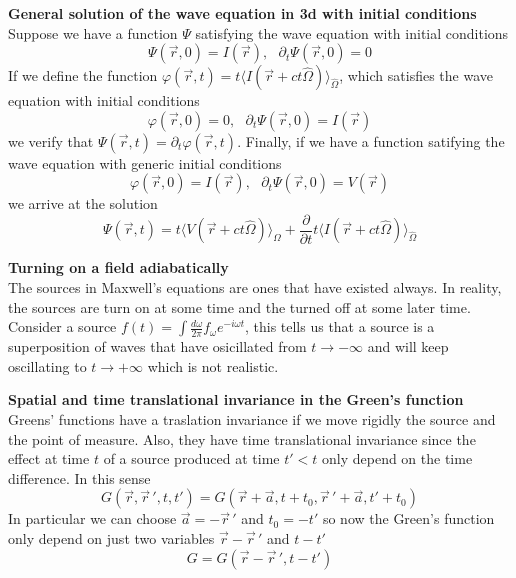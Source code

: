 \documentclass[12pt,a4paper]{article}
\newcommand{\pd}[2]{\frac{\partial #1}{\partial #2}} %
\begin{document}
\textbf{General solution of the wave equation in 3d with initial conditions}\\
Suppose we have a function $\Psi$ satisfying the wave equation with initial conditions
\begin{equation}
	\Psi(\vec{r},0) = I(\vec{r}), \ \ \ \partial_t \Psi(\vec{r},0) = 0
\end{equation}
If we define the function $\varphi(\vec{r},t) =t \langle I(\vec{r} + ct\hat{\Omega}) \rangle_{\hat{\Omega}}$, which satisfies the wave equation with initial conditions 
\begin{equation}
	\varphi(\vec{r},0) = 0, \ \ \ \partial_t \Psi(\vec{r},0) = I(\vec{r})
\end{equation}
we verify that $\Psi(\vec{r},t) = \partial_t \varphi(\vec{r},t)$. Finally, if we have a function satifying the wave equation with generic initial conditions
\begin{equation}
	\varphi(\vec{r},0) = I(\vec{r}), \ \ \ \partial_t \Psi(\vec{r},0) = V(\vec{r})
\end{equation}
we arrive at the solution
\begin{equation}
	\Psi(\vec{r},t) = t \langle V(\vec{r} + ct\hat{\Omega})\rangle_{\hat{\Omega}} + \pd{}{t} t \langle I(\vec{r} + ct\hat{\Omega})\rangle_{\hat{\Omega}}
\end{equation}

\textbf{Turning on a field adiabatically}\\
The sources in Maxwell's equations are ones that have existed always. In reality, the sources are turn on at some time and the turned off at some later time.
Consider a source $f(t) = \int \frac{d\omega}{2\pi}f_{\omega}e^{-i\omega t}$, this tells us that a source is a superposition of waves that have osicillated from $t\to-\infty$ and will keep oscillating to $t\to+\infty$ which is not realistic.



\textbf{Spatial and time translational invariance in the Green's function}\\
Greens' functions have a traslation invariance if we move rigidly the source and the point of measure. Also, they have time translational invariance since  the effect at time $t$ of a source produced at time $t'<t$ only depend on the time difference. In this sense
\begin{equation}
	G(\vec{r},\vec{r}\,',t,t')= G(\vec{r}+ \vec{a},t+t_0,\vec{r}\,'+\vec{a},t'+t_0) 
\end{equation}   
In particular we can choose $\vec{a} = -\vec{r}\,'$ and $t_0 = -t'$ so now the Green's function only depend on just two variables $\vec{r}-\vec{r}\,'$ and $t-t'$ 
\begin{equation}
	G = G(\vec{r}-\vec{r}\,',t-t')
\end{equation}
\end{document}
